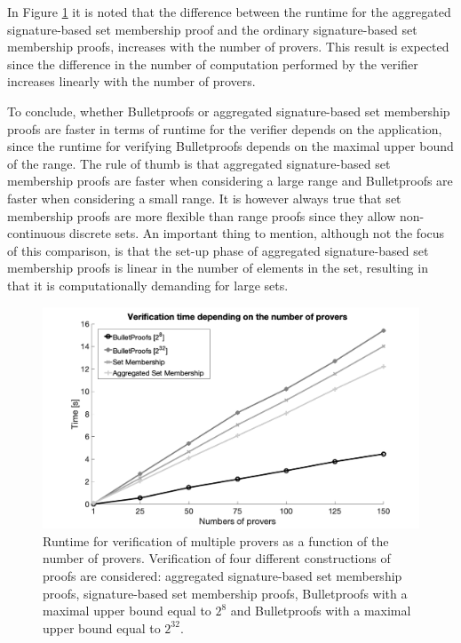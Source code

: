 In Figure \ref{fig:NrClients} it is noted that the difference between the runtime for the aggregated signature-based set membership proof and the ordinary signature-based set membership proofs, increases with the number of provers. This result is expected since the difference in the number of computation performed by the verifier increases linearly with the number of provers. 

To conclude, whether Bulletproofs or aggregated signature-based set membership proofs are faster in terms of runtime for the verifier depends on the application, since the runtime for verifying  Bulletproofs depends on the maximal upper bound of the range. The rule of thumb is that aggregated signature-based set membership proofs are faster when considering a large range and Bulletproofs are faster when considering a small range. It is however always true that set membership proofs are more flexible than range proofs since they allow non-continuous discrete sets. An important thing to mention, although not the focus of this comparison, is that the set-up phase of aggregated signature-based set membership proofs is linear in the number of elements in the set, resulting in that it is computationally demanding for large sets. 




 \begin{figure}[]
\includegraphics[width=\linewidth]{./figure/verificationNbrClients.png}
\caption{Runtime for verification of multiple provers as a function of the number of provers. Verification of four different constructions of proofs  are considered: aggregated signature-based set membership proofs, signature-based set membership proofs, Bulletproofs with a maximal upper bound equal to $2^8$ and Bulletproofs with a maximal upper bound equal  to $2^{32}$.}
\label{fig:NrClients}
\end{figure}
